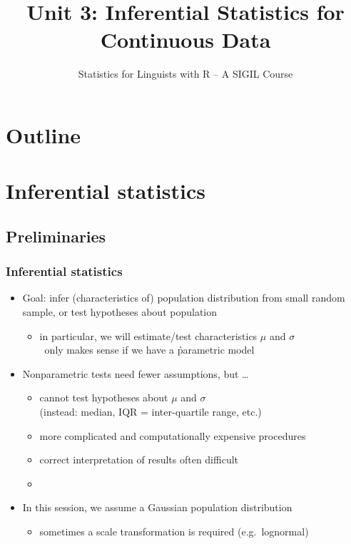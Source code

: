 \documentclass[t]{beamer} %
\title[3b.\ Continuous Data: Inference]{Unit 3: Inferential Statistics for Continuous Data}
\subtitle{Statistics for Linguists with R -- A SIGIL Course}
\date[sigil.r-forge.r-project.org]{%
  \light{\tiny \sigilcopyright}}
\begin{document}
\frame{\titlepage}


\section*{Outline}

\section{Inferential statistics}

\subsection{Preliminaries}

\begin{frame}
  \frametitle{Inferential statistics}

  \begin{itemize}
  \item Goal: infer (characteristics of) population distribution from small
    random sample, or test hypotheses about population
    \begin{itemize}
    \item in particular, we will estimate/test characteristics $\mu$ and $\sigma$\\
      \hand\ only makes sense if we have a \h{parametric} model
    \end{itemize}
  \item Nonparametric tests need fewer assumptions, but \ldots
    \begin{itemize}
    \item cannot test hypotheses about $\mu$ and $\sigma$\\
      (instead: median, IQR = inter-quartile range, etc.)
    \item more complicated and computationally expensive procedures
    \item correct interpretation of results often difficult
    \item[]
    \end{itemize}
  \item In this session, we assume a Gaussian population distribution
    \begin{itemize}
    \item sometimes a scale transformation is required (e.g.\ lognormal)
    \end{itemize}
  \end{itemize}
\end{frame}
\end{document}
